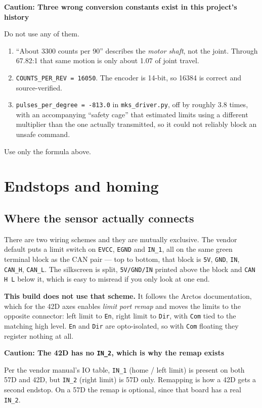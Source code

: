 \documentclass[11pt,letterpaper]{article}
\newenvironment{caution}[1]{%
    \par\addvspace{8pt}%
    \noindent{\color{cautionred}\rule{\linewidth}{0.8pt}}\par\vspace{2pt}
    \noindent\textbf{\color{cautionred}Caution: #1}\par\vspace{2pt}
}{%
    \par\vspace{2pt}\noindent{\color{cautionred}\rule{\linewidth}{0.4pt}}%
    \par\addvspace{8pt}%
}
\begin{document}
\begin{caution}{Three wrong conversion constants exist in this project's history}
Do not use any of them.
\begin{enumerate}[leftmargin=*]
    \item ``About 3300 counts per 90\textdegree'' describes the \emph{motor shaft},
          not the joint. Through 67.82:1 that same motion is only about
          1.07\textdegree{} of joint travel.
    \item \texttt{COUNTS\_PER\_REV = 16050}. The encoder is 14-bit, so 16384 is
          correct and source-verified.
    \item \texttt{pulses\_per\_degree = -813.0} in \texttt{mks\_driver.py}, off by
          roughly 3.8 times, with an accompanying ``safety cage'' that estimated
          limits using a different multiplier than the one actually transmitted, so
          it could not reliably block an unsafe command.
\end{enumerate}
Use only the formula above.
\end{caution}

\section{Endstops and homing}
\label{sec:endstops}

\subsection{Where the sensor actually connects}
There are two wiring schemes and they are mutually exclusive. The vendor default
puts a limit switch on \texttt{EVCC}, \texttt{EGND} and \texttt{IN\_1}, all on the
same green terminal block as the CAN pair --- top to bottom, that block is
\texttt{5V}, \texttt{GND}, \texttt{IN}, \texttt{CAN\_H}, \texttt{CAN\_L}. The
silkscreen is split, \texttt{5V/GND/IN} printed above the block and \texttt{CAN H L}
below it, which is easy to misread if you only look at one end.

\textbf{This build does not use that scheme.} It follows the Arctos documentation,
which for the 42D axes enables \emph{limit port remap} and moves the limits to the
opposite connector: left limit to \texttt{En}, right limit to \texttt{Dir}, with
\texttt{Com} tied to the matching high level. \texttt{En} and \texttt{Dir} are
opto-isolated, so with \texttt{Com} floating they register nothing at all.

\begin{caution}{The 42D has no \texttt{IN\_2}, which is why the remap exists}
Per the vendor manual's IO table, \texttt{IN\_1} (home / left limit) is present on
both 57D and 42D, but \texttt{IN\_2} (right limit) is 57D only. Remapping is how a
42D gets a second endstop. On a 57D the remap is optional, since that board has a
real \texttt{IN\_2}.
\end{caution}
\end{document}
